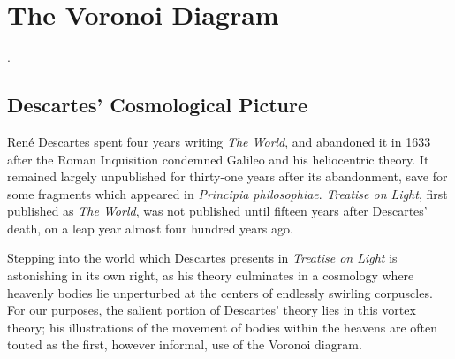 \documentclass[12pt,twoside]{reedthesis}
\begin{document}

  \mainmatter %
  \pagestyle{fancyplain} %

  \chapter{The Voronoi Diagram}

   \citeauthor[p.~21]{descartes}.


  \section{Descartes' Cosmological Picture} %
  \label{sec:the_world}
    Ren\'{e} Descartes spent four years writing \emph{The World}, and abandoned it in 1633 after the Roman Inquisition condemned Galileo and his heliocentric theory. It remained largely unpublished for thirty-one years after its abandonment, save for some fragments which appeared in \emph{Principia philosophiae}. \emph{Treatise on Light}, first published as \emph{The World}, was not published until fifteen years after Descartes' death, on a leap year almost four hundred years ago. \par

    Stepping into the world which Descartes presents in \emph{Treatise on Light} is astonishing in its own right, as his theory culminates in a cosmology where heavenly bodies lie unperturbed at the centers of endlessly swirling corpuscles. For our purposes, the salient portion of Descartes' theory lies in this vortex theory; his illustrations of the movement of bodies within the heavens are often touted as the first, however informal, use of the Voronoi diagram. \par
\end{document}
